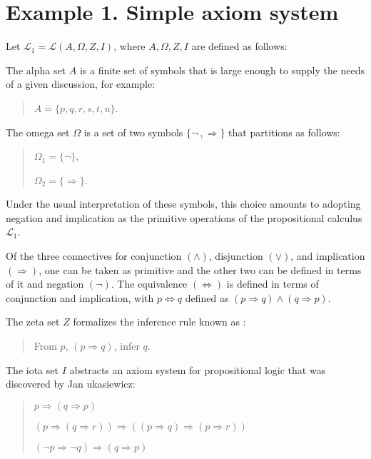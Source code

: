 \documentclass[12pt]{article}
\begin{document}
\section{Example 1.  Simple axiom system}

Let $\mathcal{L}_1 = \mathcal{L}(A, \Omega, Z, I)$, where $A, \Omega, Z, I$ are defined as follows:

The alpha set $A$ is a finite set of symbols that is large enough to supply the needs of a given discussion, for example:

\begin{quote}
$A = \{ p, q, r, s, t, u \}$.
\end{quote}

The omega set $\Omega$ is a set of two symbols $\{ \lnot\ , \Rightarrow \}$ that partitions as follows:

\begin{quote}
$\Omega_1 = \{ \lnot \}$,

$\Omega_2 = \{ \Rightarrow \}$.
\end{quote}

Under the usual interpretation of these symbols, this choice amounts to adopting negation and implication as the primitive operations of the propositional calculus $\mathcal{L}_1$.  

Of the three connectives for conjunction $(\land)$, disjunction $(\lor)$, and implication $(\Rightarrow)$, one can be taken as primitive and the other two can be defined in terms of it and negation $(\lnot)$.  The equivalence $(\Leftrightarrow)$ is defined in terms of conjunction and implication, with $p \Leftrightarrow q$ defined as $(p \Rightarrow q) \land (q \Rightarrow p)$.

The zeta set $Z$ formalizes the inference rule known as \textit{}:

\begin{quote}
From $p$, $(p \Rightarrow q)$, infer $q$.
\end{quote}

The iota set $I$ abstracts an axiom system for propositional logic that was discovered by Jan \text{\L}ukasiewicz:

\begin{quote}
$p \Rightarrow (q \Rightarrow p)$

$(p \Rightarrow (q \Rightarrow r)) \Rightarrow ((p \Rightarrow q) \Rightarrow (p \Rightarrow r))$

$(\lnot p \Rightarrow \lnot q) \Rightarrow (q \Rightarrow p)$
\end{quote}
\end{document}
